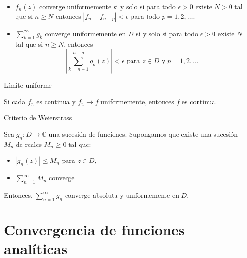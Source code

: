 \documentclass[spanish,presentation]{beamer}
\begin{document}
\begin{frame}[label=sec-1-6]{}
\begin{theorem}
\begin{itemize}
\item \(f_{n}(z)\) converge uniformemente si y solo si para todo \(\epsilon>0\) existe
\(N>0\) tal que si \(n\geq N\) entonces
\(|f_{n}-f_{n+p}|<\epsilon\) para todo \(p=1,2,\ldots\).
\item \(\sum_{k=1}^{\infty}g_{k}\) converge uniformemente en \(D\) si y solo si para todo
\(\epsilon>0\) existe \(N\) tal que si \(n\geq N\), entonces
\begin{displaymath}
\left| \sum_{k=n+1}^{n+p}g_{k}(z) \right|<\epsilon\text{ para \(z\in D\) y \(p=1,2,\ldots\)}
\end{displaymath}
\end{itemize}
\end{theorem}
\end{frame}

\begin{frame}[label=sec-1-7]{Límite uniforme}
\begin{theorem}
Si cada \(f_{n}\) es continua y \(f_{n}\to f\) uniformemente,
entonces \(f\) es continua.
\end{theorem}
\end{frame}

\begin{frame}[label=sec-1-8]{Criterio de Weierstrass}
\begin{theorem}
Sea \(g_{n}\colon D\to \mathbb{C}\) una sucesión de
funciones. Supongamos que existe una sucesión \(M_{n}\) de reales
\(M_{n}\geq 0\) tal que:

\begin{itemize}
\item \(|g_{n}(z)|\leq M_{n}\) para \(z\in D\),
\item \(\sum_{n=1}^{\infty}M_{n}\) converge
\end{itemize}

Entonces, \(\sum_{n=1}^{\infty}g_{n}\) converge absoluta y
uniformemente en \(D\).
\end{theorem}
\end{frame}


\section{Convergencia de funciones analíticas}
\label{sec-2}
\end{document}
